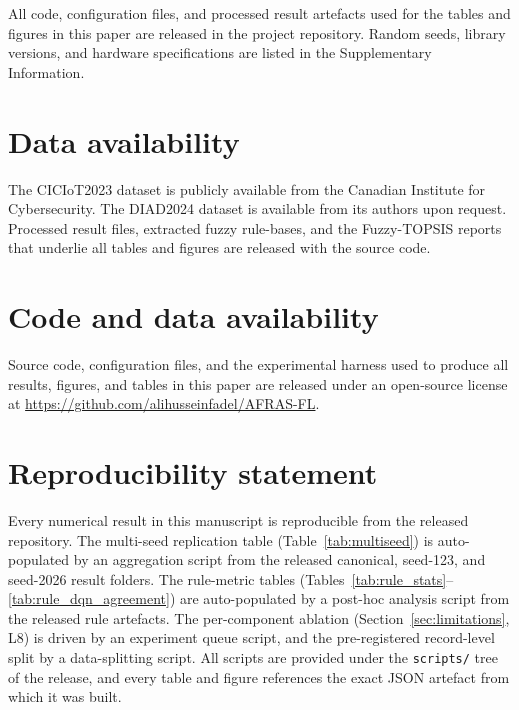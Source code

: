 \documentclass[ai,article,submit,moreauthors,pdftex]{Definitions/mdpi}
\newcommand{\rev}[1]{#1}
\begin{document}
All code, configuration files, and processed result artefacts
used for the tables and figures in this paper are released in the
project repository. Random seeds, library versions, and hardware
specifications are listed in the Supplementary Information.






\section*{Data availability}
The CICIoT2023 dataset is publicly available from the Canadian Institute
for Cybersecurity\cite{ciciot2023}. The DIAD2024 dataset is available
from its authors upon request\cite{diad2024}. Processed result files,
extracted fuzzy rule-bases, and the Fuzzy-TOPSIS reports that underlie
all tables and figures are released with the source code.

\section*{Code and data availability}
Source code, configuration files, and the experimental harness used to
produce all results, figures, and tables in this paper are released
under an open-source license at \url{https://github.com/alihusseinfadel/AFRAS-FL}.

\rev{\section*{Reproducibility statement}
Every numerical result in this manuscript is reproducible from the released
repository. The multi-seed replication table
(Table~\ref{tab:multiseed}) is auto-populated by an aggregation script
from the released canonical, seed-123, and seed-2026 result folders. The
rule-metric tables (Tables~\ref{tab:rule_stats}--\ref{tab:rule_dqn_agreement})
are auto-populated by a post-hoc analysis script from the released rule
artefacts. The per-component ablation (Section~\ref{sec:limitations}, L8)
is driven by an experiment queue script, and the pre-registered
record-level split by a data-splitting script. All scripts are provided
under the \texttt{scripts/} tree of the release, and every table and
figure references the exact JSON artefact from which it was built.}
\end{document}
